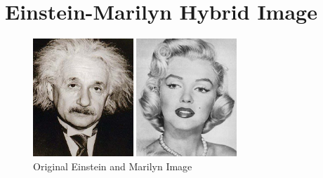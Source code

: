 \documentclass[12pt]{report}
\begin{document}
\section{Einstein-Marilyn Hybrid Image}
\vspace{1.25em}
\begin{figure}[H]
    \centering
    \begin{minipage}{0.45\textwidth}
            \centering
            \includegraphics[height=12em]{./images/einstein.jpg}
        \end{minipage}
        \begin{minipage}{0.45\textwidth}
            \centering
            \includegraphics[height=12em]{./images/marilyn.jpg}
        \end{minipage}
        \caption{Original Einstein and Marilyn Image}
        \label{einstein_marilyn}
\end{figure}
\end{document}
